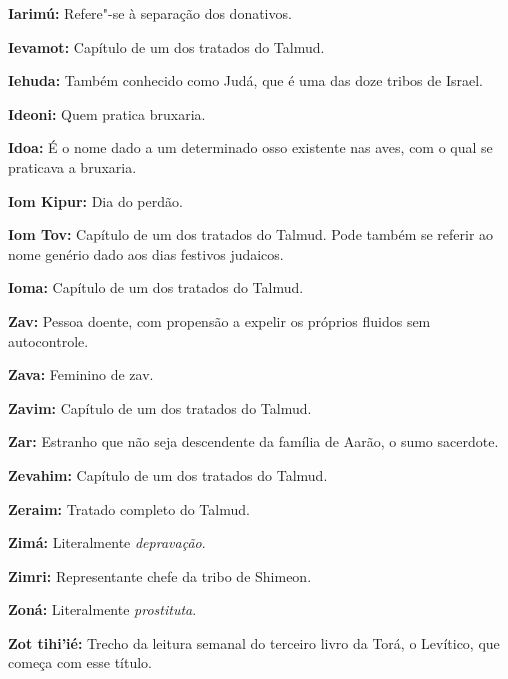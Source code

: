 \begin{hangparas}{.25in}{1}
{\textbf{Iarimú:} Refere"-se à separação dos donativos.

\textbf{Ievamot:} Capítulo de um dos tratados do Talmud.

\textbf{Iehuda:} Também conhecido como Judá, que é uma das doze tribos de Israel.

\textbf{Ideoni:} Quem pratica bruxaria.

\textbf{Idoa:} É o nome dado a um determinado osso existente nas aves, 
com o qual se praticava a bruxaria.

\textbf{Iom Kipur:} Dia do perdão.

\textbf{Iom Tov:} Capítulo de um dos tratados do Talmud. Pode também 
se referir ao nome genério dado aos dias festivos judaicos.

\textbf{Ioma:} Capítulo de um dos tratados do Talmud.

\textbf{Zav:} Pessoa doente, com propensão a expelir os 
próprios fluidos sem autocontrole.

\textbf{Zava:} Feminino de zav.

\textbf{Zavim:} Capítulo de um dos tratados do Talmud.

\textbf{Zar:} Estranho que não seja descendente da família de Aarão, o
sumo sacerdote.

\textbf{Zevahim:} Capítulo de um dos tratados do Talmud.

\textbf{Zeraim:} Tratado completo do Talmud.

\textbf{Zimá:} Literalmente \emph{depravação}.

\textbf{Zimri:} Representante chefe da tribo de Shimeon.

\textbf{Zoná:} Literalmente \emph{prostituta}.

\textbf{Zot tihi'ié:} Trecho da leitura semanal do terceiro livro da Torá, 
o Levítico, que começa com esse título.
}
\end{hangparas}

